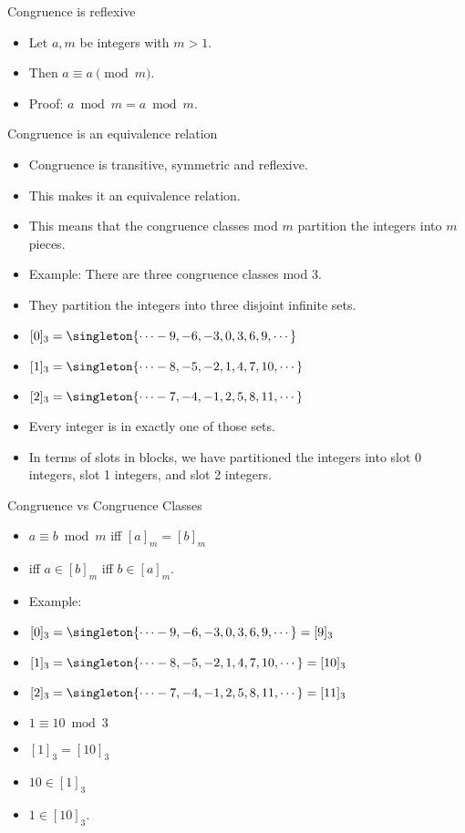 \documentclass{beamer}
\begin{document}
\begin{frame}{Congruence is reflexive}

\begin{itemize}
  \item  Let $a, m$ be integers with $m>1$.
  \item Then $a\equiv a \pmod m$.
  \item Proof: $a \bmod m = a \bmod m$.
\end{itemize}

\end{frame}


\begin{frame}{Congruence is an equivalence relation}

\begin{itemize}
  \item  Congruence is transitive, symmetric and reflexive.
  \item This makes it an equivalence relation.
  \item This means that the congruence classes mod $m$ partition the integers into $m$ pieces.
  \item Example: There are three congruence classes mod 3.
  \item They partition the integers into three disjoint infinite sets.
  \item $[0]_3 = \singleton{\cdots -9, -6, -3, 0, 3, 6, 9,\cdots}$
  \item $[1]_3 = \singleton{\cdots -8, -5, -2, 1, 4, 7, 10,\cdots}$
  \item $[2]_3 = \singleton{\cdots -7, -4, -1, 2, 5, 8, 11,\cdots}$
  \item Every integer is in exactly one of those sets.
  \item In terms of slots in blocks, we have partitioned the integers into slot 0 integers,
  slot 1 integers, and slot 2 integers.
\end{itemize}

\end{frame}


\begin{frame}{Congruence vs Congruence Classes}

\begin{itemize}
  \item  $a\equiv b \bmod m$ iff $[a]_m = [b]_m$
  \item iff $a\in[b]_m$ iff $b\in[a]_m$.
  \item Example:
  \item $[0]_3 = \singleton{\cdots -9, -6, -3, 0, 3, 6, 9,\cdots} = [9]_3$
  \item $[1]_3 = \singleton{\cdots -8, -5, -2, 1, 4, 7, 10,\cdots} =[10]_3$
  \item $[2]_3 = \singleton{\cdots -7, -4, -1, 2, 5, 8, 11,\cdots} = [11]_3$
  \item $1 \equiv 10 \bmod 3$
  \item $[1]_3 = [10]_3$
  \item $10\in [1]_3$
  \item $1\in[10]_3$.
\end{itemize}

\end{frame}
\end{document}
